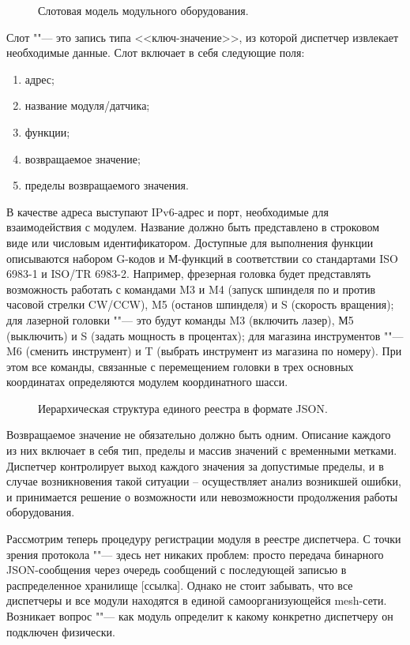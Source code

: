 \begin{figure}[ht]
	\caption{Слотовая модель модульного оборудования.}\label{fig:main-arch}
\end{figure}

Слот ""--- это запись типа <<ключ-значение>>, из которой диспетчер извлекает необходимые данные. Слот включает в себя следующие поля:

\begin{enumerate}
	\item адрес;
	\item название модуля/датчика;
	\item функции;
	\item возвращаемое значение;
	\item пределы возвращаемого значения.
\end{enumerate}

В качестве адреса выступают IPv6-адрес и порт, необходимые для взаимодействия с модулем. Название должно быть представлено в строковом виде или числовым идентификатором. Доступные для выполнения функции описываются набором G-кодов и М-функций в соответствии со стандартами ISO 6983-1 и ISO/TR 6983-2.
Например, фрезерная головка будет представлять возможность работать с командами M3 и M4 (запуск шпинделя по и против часовой стрелки CW/CCW), M5 (останов шпинделя) и S (скорость вращения); для лазерной головки ""--- это будут команды M3 (включить лазер), М5 (выключить) и S (задать мощность в процентах); для магазина инструментов ""--- M6 (сменить инструмент) и T (выбрать инструмент из магазина по номеру).  При этом все команды, связанные с перемещением головки в трех основных координатах определяются модулем координатного шасси.

\begin{figure}[ht]
\caption{Иерархическая структура единого реестра в формате JSON.}\label{fig:json}
\end{figure}

Возвращаемое значение не обязательно должно быть одним. Описание каждого из них включает в себя тип, пределы и массив значений с временными метками. Диспетчер контролирует выход каждого значения за допустимые пределы, и в случае возникновения такой ситуации – осуществляет анализ возникшей ошибки, и принимается решение о возможности или невозможности продолжения работы оборудования.

Рассмотрим теперь процедуру регистрации модуля в реестре диспетчера. С точки зрения протокола ""--- здесь нет никаких проблем: просто передача бинарного JSON-сообщения через очередь сообщений с последующей записью в распределенное хранилище [ссылка]. Однако не стоит забывать, что все диспетчеры и все модули находятся в единой самоорганизующейся mesh-сети. Возникает вопрос ""--- как модуль определит к какому конкретно диспетчеру он подключен физически.

